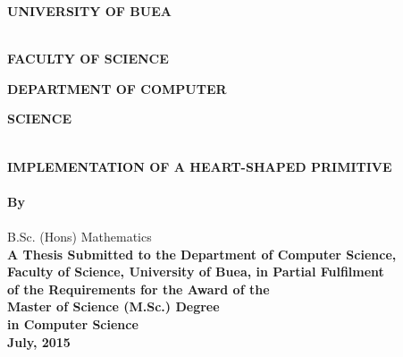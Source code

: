 \documentclass[11pt, oneside]{Thesis} %
\title{\ttitle} %
\begin{document}
\frontmatter %

\begin{titlepage}
\begin{center}
\textsc{\Large \textbf{UNIVERSITY OF BUEA}}\\[25pt]\\[3.0cm] %
\end{center}

\begin{minipage}{0.5\textwidth}
\begin{flushleft}
\large\textbf{FACULTY OF SCIENCE}
\end{flushleft}
\end{minipage}
\begin{minipage}{0.5\textwidth}
\begin{flushright}
\large\textbf{DEPARTMENT OF COMPUTER}\\  
\end{flushright}
\end{minipage}
\large \hspace*{275} \textbf{SCIENCE}
\hspace{200}\\

\begin{center}
\\[1.5cm]
{\large \bfseries IMPLEMENTATION OF A HEART-SHAPED PRIMITIVE}\\[0.4cm] %
\\[2.5cm]

\large \textbf{ By } \\[0.75cm]

\Large \textbf{\authornames} \\ 

\small B.Sc. (Hons) Mathematics \\[2.5cm]

\large \textbf{A Thesis Submitted to the Department of Computer Science, \\
		Faculty of Science, University of Buea, in Partial Fulfilment \\ 
		of the Requirements for the Award of the \\
		Master of Science (M.Sc.) Degree \\
		in Computer Science}\\[2.5cm]

\large \textbf{July, 2015}

\end{center}

\end{titlepage}
\end{document}
